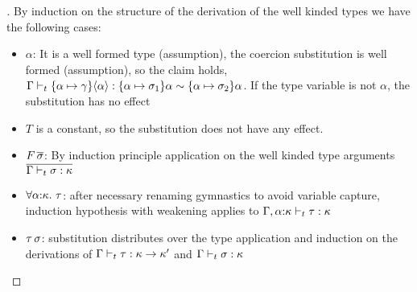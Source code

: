 \documentclass[screen,nonacm,manuscript,review]{acmart} %
\begin{document}
\begin{proof}[]
By induction on the structure of the derivation of the well kinded
types we have the following cases:

\begin{itemize}
\item[\trule{ty-var}] $\alpha$: It is a well formed type (assumption), the coercion
  substitution is well formed (assumption), so the claim holds,
  $\Gamma \vdash_{t} \{\alpha \mapsto \gamma\}\langle{\alpha}\rangle : \{\alpha \mapsto \sigma_1\}\alpha \sim \{\alpha \mapsto \sigma_2\}\alpha$.
  If the type variable is not $\alpha$, the substitution has no effect
\item[\trule{ty-con}] $T$ is a constant, so the substitution does not
  have any effect.
\item[\trule{ty-fcon}] $F\,{\overline{\sigma}}$: By
  induction principle application on the well kinded type arguments
  $\overline{\Gamma \vdash_{t} \sigma : \kappa}$
\item[\trule{ty-all}] $\forall\alpha{:}\kappa.~\tau$:
  after necessary renaming gymnastics to avoid variable capture,
  induction hypothesis with weakening applies to $\Gamma,\alpha{:}\kappa \vdash_{t} \tau : \kappa$
\item[\trule{ty-app}] $\tau\,\sigma$: substitution distributes
  over the type application and induction on the derivations of
  $\Gamma \vdash_{t} \tau : \kappa \to \kappa'$
  and $\Gamma \vdash_{t} \sigma : \kappa$
\end{itemize}
\end{proof}
\end{document}
